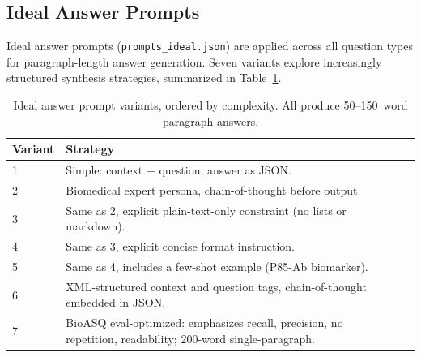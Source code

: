\subsection{Ideal Answer Prompts}
Ideal answer prompts (\texttt{prompts\_ideal.json}) are applied across all question types for paragraph-length answer generation. Seven variants explore increasingly structured synthesis strategies, summarized in Table~\ref{tab:prompts-ideal}.
\begin{table}[ht]
  \centering
  \caption{Ideal answer prompt variants, ordered by complexity. All produce 50--150~word paragraph answers.}
  \label{tab:prompts-ideal}
  \footnotesize
  \begin{tabular}{llp{11.5cm}}
    \toprule
    \textbf{Variant} & \textbf{Strategy} \\
    \midrule
    1 & Simple: context + question, answer as JSON. \\
    2 & Biomedical expert persona, chain-of-thought before output. \\
    3 & Same as 2, explicit plain-text-only constraint (no lists or markdown). \\
    4 & Same as 3, explicit concise format instruction. \\
    5 & Same as 4, includes a few-shot example (P85-Ab biomarker). \\
    6 & XML-structured context and question tags, chain-of-thought embedded in JSON. \\
    7 & BioASQ eval-optimized: emphasizes recall, precision, no repetition, readability; 200-word single-paragraph. \\
    \bottomrule
  \end{tabular}
\end{table}
